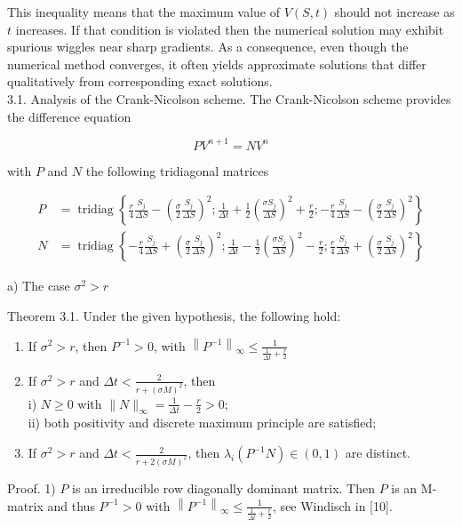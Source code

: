 \documentclass[10pt]{article}
\begin{document}
This inequality means that the maximum value of $V(S, t)$ should not increase as $t$ increases. If that condition is violated then the numerical solution may exhibit spurious wiggles near sharp gradients. As a consequence, even though the numerical method converges, it often yields approximate solutions that differ qualitatively from corresponding exact solutions.\\
3.1. Analysis of the Crank-Nicolson scheme. The Crank-Nicolson scheme provides the difference equation

$$
P V^{n+1}=N V^{n}
$$

with $P$ and $N$ the following tridiagonal matrices

$$
\begin{aligned}
P & =\operatorname{tridiag}\left\{\frac{r}{4} \frac{S_{j}}{\Delta S}-\left(\frac{\sigma}{2} \frac{S_{j}}{\Delta S}\right)^{2} ; \frac{1}{\Delta t}+\frac{1}{2}\left(\frac{\sigma S_{j}}{\Delta S}\right)^{2}+\frac{r}{2} ;-\frac{r}{4} \frac{S_{j}}{\Delta S}-\left(\frac{\sigma}{2} \frac{S_{j}}{\Delta S}\right)^{2}\right\} \\
N & =\operatorname{tridiag}\left\{-\frac{r}{4} \frac{S_{j}}{\Delta S}+\left(\frac{\sigma}{2} \frac{S_{j}}{\Delta S}\right)^{2} ; \frac{1}{\Delta t}-\frac{1}{2}\left(\frac{\sigma S_{j}}{\Delta S}\right)^{2}-\frac{r}{2} ; \frac{r}{4} \frac{S_{j}}{\Delta S}+\left(\frac{\sigma}{2} \frac{S_{j}}{\Delta S}\right)^{2}\right\}
\end{aligned}
$$

a) The case $\sigma^{2}>r$

Theorem 3.1. Under the given hypothesis, the following hold:

\begin{enumerate}
  \item If $\sigma^{2}>r$, then $P^{-1}>0$, with $\left\|P^{-1}\right\|_{\infty} \leq \frac{1}{\frac{1}{\Delta t}+\frac{r}{2}}$
  \item If $\sigma^{2}>r$ and $\Delta t<\frac{2}{r+(\sigma M)^{2}}$, then\\
i) $N \geq 0$ with $\|N\|_{\infty}=\frac{1}{\Delta t}-\frac{r}{2}>0$;\\
ii) both positivity and discrete maximum principle are satisfied;
  \item If $\sigma^{2}>r$ and $\Delta t<\frac{2}{r+2(\sigma M)^{2}}$, then $\lambda_{i}\left(P^{-1} N\right) \in(0,1)$ are distinct.
\end{enumerate}

Proof. 1) $P$ is an irreducible row diagonally dominant matrix. Then $P$ is an M-matrix and thus $P^{-1}>0$ with $\left\|P^{-1}\right\|_{\infty} \leq \frac{1}{\frac{1}{\Delta t}+\frac{r}{2}}$, see Windisch in [10].
\end{document}
